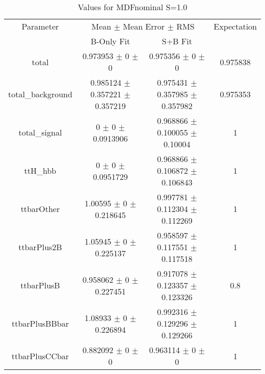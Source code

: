 \begin{table}
\centering
\caption{Values for MDFnominal S=1.0}
\begin{tabular}{cccc}
\toprule
Parameter & \multicolumn{2}{c}{Mean $\pm$ Mean Error $\pm$ RMS} & Expectation\\
 & B-Only Fit & S+B Fit & \\
\midrule
total & \num{0.973953} $\pm$ \num{0} $\pm$ \num{0} & \num{0.975356} $\pm$ \num{0} $\pm$ \num{0} & \num{0.975838}\\
total\_background & \num{0.985124} $\pm$ \num{0.357221} $\pm$ \num{0.357219} & \num{0.975431} $\pm$ \num{0.357985} $\pm$ \num{0.357982} & \num{0.975353}\\
total\_signal & \num{0} $\pm$ \num{0} $\pm$ \num{0.0913906} & \num{0.968866} $\pm$ \num{0.100055} $\pm$ \num{0.10004} & \num{1}\\
ttH\_hbb & \num{0} $\pm$ \num{0} $\pm$ \num{0.0951729} & \num{0.968866} $\pm$ \num{0.106872} $\pm$ \num{0.106843} & \num{1}\\
ttbarOther & \num{1.00595} $\pm$ \num{0} $\pm$ \num{0.218645} & \num{0.997781} $\pm$ \num{0.112304} $\pm$ \num{0.112269} & \num{1}\\
ttbarPlus2B & \num{1.05945} $\pm$ \num{0} $\pm$ \num{0.225137} & \num{0.958597} $\pm$ \num{0.117551} $\pm$ \num{0.117518} & \num{1}\\
ttbarPlusB & \num{0.958062} $\pm$ \num{0} $\pm$ \num{0.227451} & \num{0.917078} $\pm$ \num{0.123357} $\pm$ \num{0.123326} & \num{0.8}\\
ttbarPlusBBbar & \num{1.08933} $\pm$ \num{0} $\pm$ \num{0.226894} & \num{0.992316} $\pm$ \num{0.129296} $\pm$ \num{0.129266} & \num{1}\\
ttbarPlusCCbar & \num{0.882092} $\pm$ \num{0} $\pm$ \num{0} & \num{0.963114} $\pm$ \num{0} $\pm$ \num{0} & \num{1}\\
\bottomrule
\end{tabular}
\end{table}